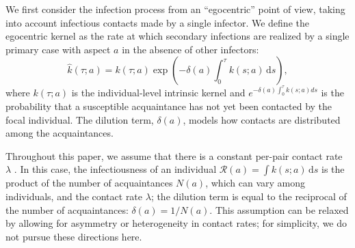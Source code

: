 \documentclass[12pt]{article}
\newcommand{\RR}{\ensuremath{{\mathcal R}}}
\begin{document}
We first consider the infection process from an ``egocentric'' point of view, taking into account infectious contacts made by a single infector.
We define the egocentric kernel as the rate at which secondary infections are realized by a single primary case with aspect $a$ in the absence of other infectors:
\begin{equation}
\hat{k}(\tau; a) = k(\tau; a) \exp \left(- \delta(a) \int_0^\tau k(s; a) \,\mathrm{d}s\right),
\end{equation}
where $k(\tau; a)$ is the individual-level intrinsic kernel and $e^{- \delta(a) \int_0^\tau k(s; a) ds}$ is the probability that a susceptible acquaintance has not yet been contacted by the focal individual.
The dilution term, $\delta(a)$, models how contacts are distributed among the acquaintances.

Throughout this paper, we assume that there is a constant per-pair contact rate $\lambda$ \cite{trapman2016inferring}.
In this case, the infectiousness of an individual $\RR(a) = \int k(s; a) \,\mathrm{d}s$ is the product of the number of acquaintances $N(a)$, which can vary among individuals, and the contact rate $\lambda$; the dilution term is equal to the reciprocal of the number of acquaintances: $\delta(a) = 1/N(a)$.
This assumption can be relaxed by allowing for asymmetry \citep{trapman2016inferring} or heterogeneity \citep{ball1997epidemics, ball2002general} in contact rates; 
for simplicity, we do not pursue these directions here.
\end{document}
